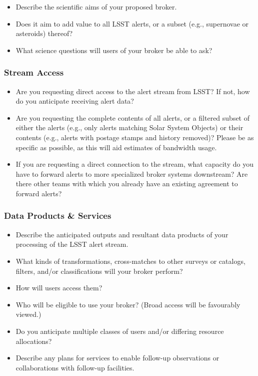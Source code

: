\documentclass[DM,toc]{lsstdoc}
\begin{document}
\begin{itemize}
\item Describe the scientific aims of your proposed broker. 
\item Does it aim to add value to all LSST alerts, or a subset (e.g., supernovae or asteroids) thereof?
\item What science questions will users of your broker be able to ask?
\end{itemize}

\subsubsection{Stream Access}

\begin{itemize}
\item Are you requesting direct access to the alert stream from LSST?  If not, how do you anticipate receiving alert data? 
\item Are you requesting the complete contents of all alerts, or a filtered subset of either the alerts (e.g., only alerts matching Solar System Objects) or their contents (e.g., alerts with postage stamps and history removed)?  Please be as specific as possible, as this will aid estimates of bandwidth usage.
\item If you are requesting a direct connection to the stream, what capacity do you have to forward alerts to more specialized broker systems downstream?  Are there other teams with which you already have an existing agreement to forward alerts?
\end{itemize}

\subsubsection{Data Products \& Services}

\begin{itemize}
\item Describe the anticipated outputs and resultant data products of your processing of the LSST alert stream. 
\item What kinds of transformations, cross-matches to other surveys or catalogs, filters, and/or classifications will your broker perform?
\item How will users access them?
\item Who will be eligible to use your broker?  (Broad access will be favourably viewed.)
\item Do you anticipate multiple classes of users and/or differing resource allocations?
\item Describe any plans for services to enable follow-up observations or collaborations with follow-up facilities.
\end{itemize}
\end{document}
